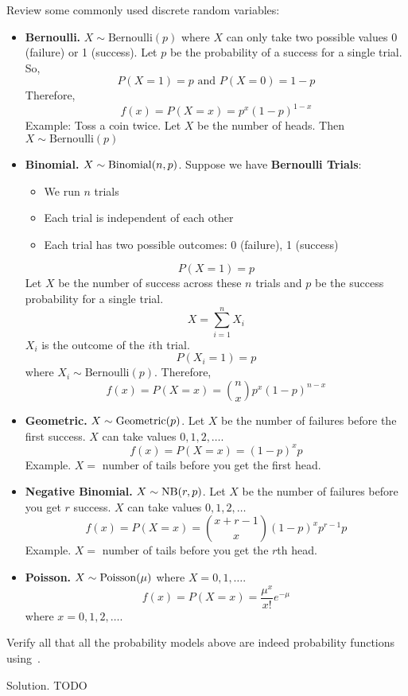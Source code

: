 Review some commonly used discrete random variables:
\begin{itemize}
    \item \textbf{Bernoulli.} $ X \sim \text{Bernoulli}(p) $
          where $ X $ can only take two possible values 0 (failure) or 1 (success).
          Let $ p $ be the probability of a success for a single trial. So,
          \[ P(X=1)=p\text{ and }P(X=0)=1-p \]
          Therefore,
          \[ f(x)=P(X=x)=p^x(1-p)^{1-x} \]
          Example: Toss a coin twice. Let $ X $ be the number of heads.
          Then $ X \sim \text{Bernoulli}(p) $
    \item \textbf{Binomial.} $ X \sim \operatorname{Binomial}(n,p) $. Suppose
          we have \textbf{Bernoulli Trials}:
          \begin{itemize}
              \item We run $ n $ trials
              \item Each trial is independent of each other
              \item Each trial has two possible outcomes: 0 (failure), 1 (success)
          \end{itemize}
          \[ P(X=1)=p \]
          Let $ X $ be the number of success across these $ n $ trials
          and $ p $ be the success probability for a single trial.
          \[ X=\sum\limits_{i=1}^{n} X_i \]
          $ X_i $ is the outcome of the $ i $th trial.
          \[ P(X_i=1)=p \]
          where $ X_i \sim \text{Bernoulli}(p) $. Therefore,
          \[ f(x)=P(X=x)=\binom{n}{x}p^x(1-p)^{n-x} \]
    \item \textbf{Geometric.} $ X \sim \operatorname{Geometric}(p) $.
          Let $ X $ be the number of failures before the first success.
          $ X $ can take values $ 0,1,2,\ldots $.
          \[ f(x)=P(X=x)=(1-p)^x p \]
          Example. $ X = $ number of tails before you get the first
          head.
    \item \textbf{Negative Binomial.} $ X \sim \operatorname{NB}(r,p) $.
          Let $ X $ be the number of failures before you get $ r $ success.
          $ X $ can take values $ 0,1,2,\ldots $
          \[ f(x)=P(X=x)=\binom{x+r-1}{x}(1-p)^x p^{r-1}p \]
          Example. $ X= $ number of tails before you get the $ r $th head.
    \item \textbf{Poisson.} $ X \sim \operatorname{Poisson}(\mu) $
          where $ X = 0,1,\ldots $.
          \[ f(x)=P(X=x)=\frac{\mu^x}{x!} e^{-\mu} \]
          where $ x=0,1,2,\ldots $.
\end{itemize}

\begin{Exercise}{}{}
    Verify all that all the probability models above are indeed
    probability functions using~.
\end{Exercise}
Solution. TODO

